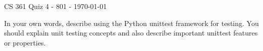 \documentclass{exam}
\begin{document}
\begin{center}
	CS 361 Quiz 4 - 801 - \today
\end{center}

\vspace{1em}

\begin{center}
\end{center}

\begin{questions}
	
\question[10] In your own words, describe using the Python unittest framework for testing. You should explain unit testing concepts and also describe important unittest features or properties.

\end{questions}
\end{document}
